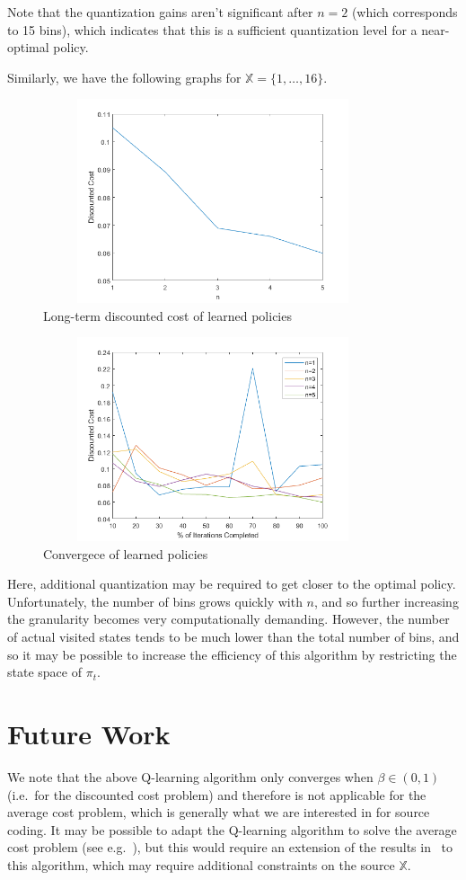 \documentclass{article}
\begin{document}
Note that the quantization gains aren't significant after \( n=2 \) (which corresponds to 15 bins), which indicates that this is a sufficient quantization level for a near-optimal policy.

Similarly, we have the following graphs for \( \mathbb{X} = \{1,\ldots,16\} \).

\begin{figure}[H]
    \centering
    \includegraphics[height=6cm, width=10cm]{Cost_16.png}
    \caption{Long-term discounted cost of learned policies}
\end{figure}

\begin{figure}[H]
    \centering
    \includegraphics[height=6cm, width=10cm]{Quantization_16.png}
    \caption{Convergece of learned policies}
\end{figure}

Here, additional quantization may be required to get closer to the optimal policy. Unfortunately, the number of bins grows quickly with \(n\), and so further increasing the granularity becomes very computationally demanding. However, the number of actual visited states tends to be much lower than the total number of bins, and so it may be possible to increase the efficiency of this algorithm by restricting the state space of \(\pi_t\).

\section{Future Work}
We note that the above Q-learning algorithm only converges when \( \beta \in (0,1) \) (i.e.\ for the discounted cost problem) and therefore is not applicable for the average cost problem, which is generally what we are interested in for source coding. It may be possible to adapt the Q-learning algorithm to solve the average cost problem (see e.g.\ \cite{Abounadi}), but this would require an extension of the results in~\cite{Kara} to this algorithm, which may require additional constraints on the source \( \mathbb{X} \).
\end{document}
